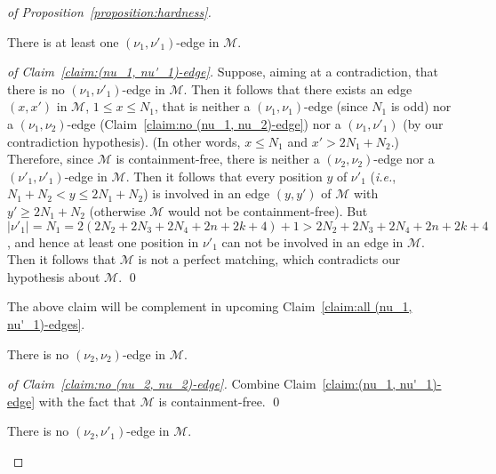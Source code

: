 \begin{proof}[of Proposition~\ref{proposition:hardness}]
  \begin{claim}
    \label{claim:(nu_1, nu'_1)-edge}
    There is at least one $(\nu_1, \nu'_1)$-edge in $\mathcal{M}$.
  \end{claim}

  \begin{proof}[of Claim~\ref{claim:(nu_1, nu'_1)-edge}]
    Suppose, aiming at a contradiction, that there is no
    $(\nu_1, \nu'_1)$-edge in $\mathcal{M}$.
    Then it follows that there exists an edge $(x, x')$ in $\mathcal{M}$,
    $1 \leq x \leq N_1$, that is neither a
    $(\nu_1, \nu_1)$-edge (since $N_1$ is odd)
    nor a $(\nu_1, \nu_2)$-edge (Claim~\ref{claim:no (nu_1, nu_2)-edge})
    nor a $(\nu_1, \nu'_1)$ (by our contradiction hypothesis).
    (In other words, $x \leq N_1$ and $x' > 2N_1 + N_2$.)
    Therefore, since $\mathcal{M}$ is containment-free,
    there is neither a $(\nu_2, \nu_2)$-edge nor a $(\nu'_1, \nu'_1)$-edge
    in $\mathcal{M}$.
    Then it follows that every position $y$ of $\nu'_1$
    (\emph{i.e.}, $N_1+N_2 < y \leq 2N_1+N_2$)
    is involved in an edge $(y, y')$ of $\mathcal{M}$ with $y' \geq 2N_1+N_2$
    (otherwise $\mathcal{M}$ would not be containment-free).
    But $|\nu'_1| = N_1 = 2(2N_2 + 2N_3 + 2N_4 + 2n + 2k + 4) + 1
    > 2N_2 + 2N_3 + 2N_4 + 2n + 2k + 4$, and hence at least one
    position in $\nu'_1$ can not be involved in an edge in $\mathcal{M}$.
    Then it follows that $\mathcal{M}$ is not a perfect matching,
    which contradicts our hypothesis about $\mathcal{M}$.
    \qed
  \end{proof}

  The above claim will be complement in upcoming Claim~\ref{claim:all (nu_1, nu'_1)-edges}.

  \begin{claim}
    \label{claim:no (nu_2, nu_2)-edge}
    There is no $(\nu_2, \nu_2)$-edge in $\mathcal{M}$.
  \end{claim}

  \begin{proof}[of Claim~\ref{claim:no (nu_2, nu_2)-edge}]
  Combine Claim~\ref{claim:(nu_1, nu'_1)-edge} with
  the fact that $\mathcal{M}$ is containment-free.
  \qed
  \end{proof}

  \begin{claim}
    \label{claim:no (nu_2, nu'_1)-edge}
    There is no $(\nu_2, \nu'_1)$-edge in $\mathcal{M}$.
  \end{claim}


\end{proof}
